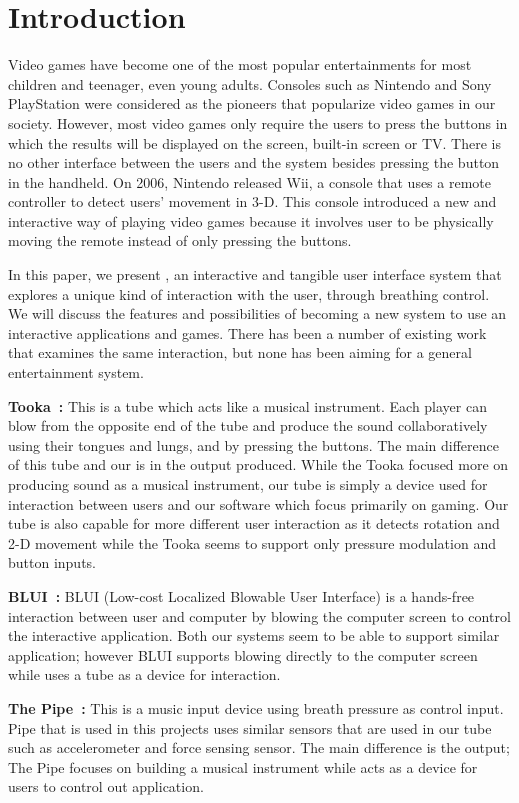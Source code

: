\section{Introduction}\label{sec:intro}

Video games have become one of the most popular entertainments for most children and teenager, even young adults. Consoles such as Nintendo and Sony PlayStation were considered as the pioneers that popularize video games in our society. However, most video games only require the users to press the buttons in which the results will be displayed on the screen, built-in screen or TV. There is no other interface between the users and the system besides pressing the button in the handheld. On 2006, Nintendo released Wii, a console that uses a remote controller to detect users’ movement in 3-D. This console introduced a new and interactive way of playing video games because it involves user to be physically moving the remote instead of only pressing the buttons.

In this paper, we present \tube, an interactive and tangible user interface system that explores a unique kind of interaction with the user, \ie through breathing control. We will discuss the features and possibilities of \tube becoming a new system to use an interactive applications and games. There has been a number of existing work that examines the same interaction, but none has been aiming for a general entertainment system.

\textbf{Tooka~\cite{tooka}:} This is a tube which acts like a musical instrument. Each player can blow from the opposite end of the tube and produce the sound collaboratively using their tongues and lungs, and by pressing the buttons. The main difference of this tube and our \tube is in the output produced. While the Tooka focused more on producing sound as a musical instrument, our tube is simply a device used for interaction between users and our software which focus primarily on gaming. Our tube is also capable for more different user interaction as it detects rotation and 2-D movement while the Tooka seems to support only pressure modulation and button inputs.

\textbf{BLUI~\cite{blui}:} BLUI (Low-cost Localized Blowable User Interface) is a hands-free interaction between user and computer by blowing the computer screen to control the interactive application. Both our systems seem to be able to support similar application; however BLUI supports blowing directly to the computer screen while \tube uses a tube as a device for interaction.

\textbf{The Pipe~\cite{thepipe}:} This is a music input device using breath pressure as control input. Pipe that is used in this projects uses similar sensors that are used in our tube such as accelerometer and force sensing sensor. The main difference is the output; The Pipe focuses on building a musical instrument while \tube acts as a device for users to control out application.

